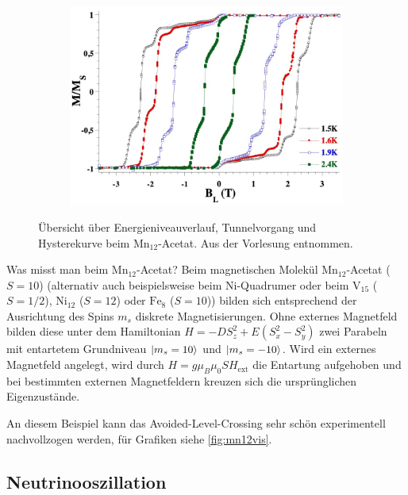 \begin{figure}
\begin{subfigure}{0.21\linewidth}
    \end{subfigure}
    \begin{subfigure}{0.9\linewidth}
        \includegraphics[width=\linewidth]{img/mn12_hysteresis.png}
    \end{subfigure}
    \caption{Übersicht über Energieniveauverlauf, Tunnelvorgang und Hysterekurve beim $\text{Mn}_{12}$-Acetat. Aus der Vorlesung entnommen.}
    \label{fig:mn12vis}
\end{figure}

\begin{fquestion}{Was misst man beim $\text{Mn}_{12}$-Acetat?}
    Beim magnetischen Molekül $\text{Mn}_{12}$-Acetat ($S = 10$) (alternativ auch beispielsweise beim $\text{Ni}$-Quadrumer oder beim $\text{V}_{15}$ ($S = 1/2$), $\text{Ni}_{12}$ ($S = 12$) oder $\text{Fe}_8$ ($S = 10$)) bilden sich entsprechend der Ausrichtung des Spins $m_s$ diskrete Magnetisierungen.
    Ohne externes Magnetfeld bilden diese unter dem Hamiltonian $H = -D S_z^2 + E (S_x^2 - S_y^2)$ zwei Parabeln mit entartetem Grundniveau $\ket{m_s = 10}$ und $\ket{m_s = -10}$.
    Wird ein externes Magnetfeld angelegt, wird durch $H = g \mu_B \mu_0 S H_{\text{ext}}$ die Entartung aufgehoben und bei bestimmten externen Magnetfeldern kreuzen sich die ursprünglichen Eigenzustände.
    
    An diesem Beispiel kann das Avoided-Level-Crossing sehr schön experimentell nachvollzogen werden, für Grafiken siehe \autoref{fig:mn12vis}.
\end{fquestion}

\subsection{Neutrinooszillation}


